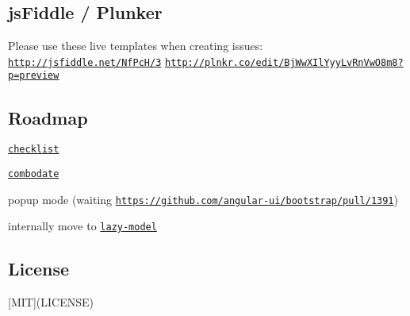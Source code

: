 \subsection*{js\+Fiddle / Plunker}

Please use these live templates when creating issues\+: \href{http://jsfiddle.net/NfPcH/3}{\tt http\+://jsfiddle.\+net/\+Nf\+Pc\+H/3} \href{http://plnkr.co/edit/BjWwXIlYyyLvRnVwO8m8?p=preview}{\tt http\+://plnkr.\+co/edit/\+Bj\+Ww\+X\+Il\+Yyy\+Lv\+Rn\+Vw\+O8m8?p=preview}

\subsection*{Roadmap}


\begin{DoxyItemize}
\item \href{https://github.com/vitalets/checklist-model}{\tt checklist}
\item \href{https://github.com/vitalets/combodate}{\tt combodate}
\item popup mode (waiting \href{https://github.com/angular-ui/bootstrap/pull/1391}{\tt https\+://github.\+com/angular-\/ui/bootstrap/pull/1391})
\item internally move to \href{https://github.com/vitalets/lazy-model}{\tt lazy-\/model}
\end{DoxyItemize}

\subsection*{License}

\mbox{[}M\+IT\mbox{]}(L\+I\+C\+E\+N\+SE) 